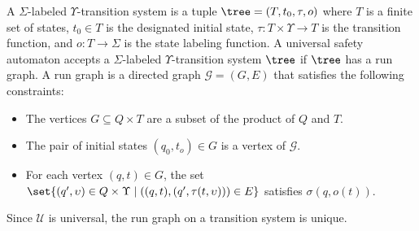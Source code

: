 \documentclass{LMCS}
\theoremstyle{plain}\newtheorem{theorem}[thm]{Theorem}
\theoremstyle{plain}\newtheorem{lemma}[thm]{Lemma}
\theoremstyle{plain}\newtheorem{proposition}[thm]{Proposition}
\theoremstyle{plain}\newtheorem{corollary}[thm]{Corollary}
\theoremstyle{definition}\newtheorem{definition}{Definition}[section]
\begin{document}
A $\Sigma$-labeled $\Upsilon$-transition system is a tuple $\tree = (T,t_0,\tau,o)$ where $T$ is a finite set of states, $t_0 \in T$ is the designated initial state, $\tau : T \times \Upsilon \rightarrow T$ is the transition function, and $o : T \rightarrow \Sigma$ is the state labeling function.
A universal safety automaton accepts a $\Sigma$-labeled $\Upsilon$-transition system $\tree$ if $\tree$ has a run graph.
A run graph is a directed graph $\mathcal{G} = (G,E)$ that satisfies the following constraints:
\begin{itemize}
  \item The vertices $G \subseteq Q \times T$ are a subset of the product of $Q$ and $T$.
  \item The pair of initial states $(q_0,t_o) \in G$ is a vertex of $\mathcal{G}$.
  \item For each vertex $(q,t) \in G$, the set $\set{ (q',\upsilon) \in Q \times \Upsilon \mid ((q,t), (q',\tau(t,\upsilon))) \in E }$ satisfies $\sigma(q, o(t))$.
\end{itemize}
Since $\mathcal{U}$ is universal, the run graph on a transition system is unique.
\end{document}

